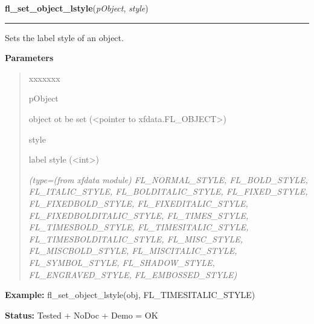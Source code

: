 \hspace{.8\funcindent}\begin{boxedminipage}{\funcwidth}

    \raggedright \textbf{fl\_set\_object\_lstyle}(\textit{pObject}, \textit{style})

    \vspace{-1.5ex}

    \rule{\textwidth}{0.5\fboxrule}
\setlength{\parskip}{2ex}
    Sets the label style of an object.

\setlength{\parskip}{1ex}
      \textbf{Parameters}
      \vspace{-1ex}

      \begin{quote}
        \begin{Ventry}{xxxxxxx}

          \item[pObject]

          object ot be set ({\textless}pointer to 
          xfdata.FL\_OBJECT{\textgreater})

          \item[style]

          label style ({\textless}int{\textgreater})

            {\it (type=(from xfdata module) FL\_NORMAL\_STYLE, FL\_BOLD\_STYLE, FL\_ITALIC\_STYLE,
FL\_BOLDITALIC\_STYLE, FL\_FIXED\_STYLE, FL\_FIXEDBOLD\_STYLE, 
FL\_FIXEDITALIC\_STYLE, FL\_FIXEDBOLDITALIC\_STYLE, FL\_TIMES\_STYLE, 
FL\_TIMESBOLD\_STYLE, FL\_TIMESITALIC\_STYLE, FL\_TIMESBOLDITALIC\_STYLE, 
FL\_MISC\_STYLE, FL\_MISCBOLD\_STYLE, FL\_MISCITALIC\_STYLE, 
FL\_SYMBOL\_STYLE, FL\_SHADOW\_STYLE, FL\_ENGRAVED\_STYLE, 
FL\_EMBOSSED\_STYLE)}

        \end{Ventry}

      \end{quote}

\textbf{Example:} fl\_set\_object\_lstyle(obj, FL\_TIMESITALIC\_STYLE)



\textbf{Status:} Tested + NoDoc + Demo = OK



    \end{boxedminipage}

    \label{xformslib:library:fl_get_object_lstyle}

